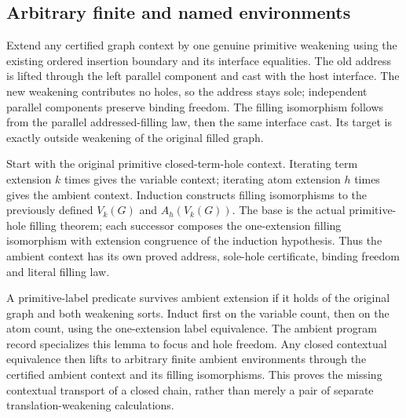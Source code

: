 \subsection{Arbitrary finite and named environments}

Extend any certified graph context by one genuine primitive weakening using
the existing ordered insertion boundary and its interface equalities. The
old address is lifted through the left parallel component and cast with the
host interface. The new weakening contributes no holes, so the address stays
sole; independent parallel components preserve binding freedom. The filling
isomorphism follows from the parallel addressed-filling law, then the same
interface cast. Its target is exactly outside weakening of the original
filled graph.



Start with the original primitive closed-term-hole context. Iterating term
extension $k$ times gives the variable context; iterating atom extension $h$
times gives the ambient context. Induction constructs filling isomorphisms
to the previously defined $V_k(G)$ and $A_h(V_k(G))$. The base is the actual
primitive-hole filling theorem; each successor composes the one-extension
filling isomorphism with extension congruence of the induction hypothesis.
Thus the ambient context has its own proved address, sole-hole certificate,
binding freedom and literal filling law.






A primitive-label predicate survives ambient extension if it holds of the
original graph and both weakening sorts. Induct first on the variable count,
then on the atom count, using the one-extension label equivalence. The
ambient program record specializes this lemma to focus and hole freedom.
Any closed contextual equivalence then lifts to arbitrary finite ambient
environments through the certified ambient context and its filling
isomorphisms. This proves the missing contextual transport of a closed chain,
rather than merely a pair of separate translation-weakening calculations.

